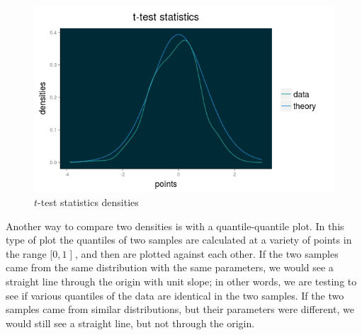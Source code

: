\begin{figure}[htbp]
 \centering
 \includegraphics[scale=.6]{images/t_test}
 \caption*{$t$-test statistics densities}
\end{figure}
Another way to compare two densities is with 
a quantile-quantile plot. In this type of plot 
the quantiles of two samples are calculated at 
a variety of points in the range 
$\mathopen[0,1\mathopen]$, 
and then are plotted against each other. If the 
two samples came from the same distribution with 
the same parameters, we would see a straight line through 
the origin with unit slope; in other words, we are 
testing to see if various quantiles of the data are 
identical in the two samples. If the two samples came 
from similar distributions, but their parameters were 
different, we would still see a straight line, 
but not through the origin.
\bigskip


